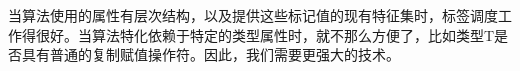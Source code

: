 当算法使用的属性有层次结构，以及提供这些标记值的现有特征集时，标签调度工作得很好。当算法特化依赖于特定的类型属性时，就不那么方便了，比如类型T是否具有普通的复制赋值操作符。因此，我们需要更强大的技术。



































